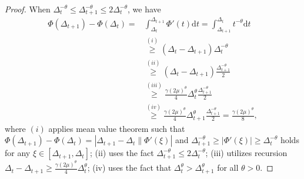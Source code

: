 \documentclass[10pt]{article} %
\newtheorem{proof}{Proof}
\begin{document}
\begin{proof}
When $\Delta_{t}^{-\theta}\leq \Delta_{t+1}^{-\theta }\leq 2 \Delta_t^{-\theta}$, we have
\begin{align}
    \Phi(\Delta_{t+1})-\Phi(\Delta_t) =& \int_{\Delta_t}^{\Delta_{t+1}}\Phi'(t)\mathrm{d}t = \int_{\Delta_{t+1}}^{\Delta_t}t^{-\theta}\mathrm{d}t \nonumber\\
    &\overset{(i)}{\geq} (\Delta_{t}-\Delta_{t+1})\Delta_t^{-\theta} \nonumber\\
    &\overset{(ii)}{\geq} (\Delta_t -\Delta_{t+1})\frac{\Delta_{t+1}^{-\theta}}{2} \nonumber\\
    &\overset{(iii)}{\geq} \frac{\gamma (2\mu)^{\theta}}{4}\Delta_t^{\theta}\frac{\Delta_{t+1}^{-\theta}}{2} \nonumber \\
    &\overset{(iv)}{\geq} \frac{\gamma (2\mu)^{\theta}}{4}\Delta_{t+1}^{\theta}\frac{\Delta_{t+1}^{-\theta}}{2}=\frac{\gamma (2\mu)^{\theta}}{8},\nonumber
\end{align}
where $(i)$ applies mean value theorem such that $\Phi(\Delta_{t+1})-\Phi(\Delta_t) = |\Delta_{t+1}-\Delta_{t} \| \Phi'(\xi)|$ and $\Delta_{t+1}^{-\theta}\geq|\Phi'(\xi)|\geq \Delta^{-\theta}_{t}$ holds for any $\xi \in [\Delta_{t+1}, \Delta_{t}]$; (ii) uses the fact $\Delta_{t+1}^{-\theta}\leq 2\Delta_{t}^{-\theta}$; (iii) utilizes recursion $\Delta_t - \Delta_{t+1} \geq \frac{\gamma (2\mu)^{\theta}}{4}\Delta_t^{\theta}$; (iv) uses the fact that $\Delta_{t}^{\theta} > \Delta_{t+1}^{\theta}$ for all $\theta >0$. 


\end{proof}
\end{document}
